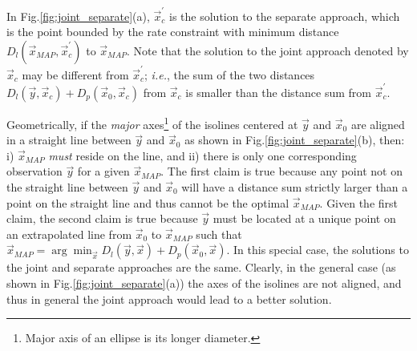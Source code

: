 In Fig.\;\ref{fig:joint_separate}(a), $\vec{x}_c^{\prime}$ is the solution to the separate approach, which is the point bounded by the rate constraint with minimum distance $D_l(\vec{x}_{MAP}, \vec{x}_c^{\prime})$ to $\vec{x}_{MAP}$.
Note that the solution to the joint approach denoted by $\vec{x}_c$ may be different from $\vec{x}_c^{\prime}$; \textit{i.e.}, the sum of the two distances $D_l(\vec{y},\vec{x}_c) + D_p(\vec{x}_0,\vec{x}_c)$ from $\vec{x}_c$ is smaller than the distance sum from $\vec{x}_c^{\prime}$. 

Geometrically, if the \textit{major} axes\footnote{Major axis of an ellipse is its longer diameter.} of the isolines centered at $\vec{y}$ and $\vec{x}_0$ are aligned in a straight line between $\vec{y}$ and $\vec{x}_0$ as shown in Fig.\;\ref{fig:joint_separate}(b), then: i) $\vec{x}_{MAP}$ \textit{must} reside on the line, and ii) there is only one corresponding observation $\vec{y}$ for a given $\vec{x}_{MAP}$.
The first claim is true because any point not on the straight line between $\vec{y}$ and $\vec{x}_0$ will have a distance sum strictly larger than a point on the straight line and thus cannot be the optimal $\vec{x}_{MAP}$. 
Given the first claim, the second claim is true because $\vec{y}$ must be located at a unique point on an extrapolated line from $\vec{x}_0$ to $\vec{x}_{MAP}$ such that $\vec{x}_{MAP} = \arg \min_{\vec{x}} D_l(\vec{y},\vec{x}) + D_p(\vec{x}_0,\vec{x})$.
In this special case, the solutions to the joint and separate approaches are the same.
Clearly, in the general case (as shown in Fig.\;\ref{fig:joint_separate}(a)) the axes of the isolines are not aligned, and thus in general the joint approach would lead to a better solution. 

